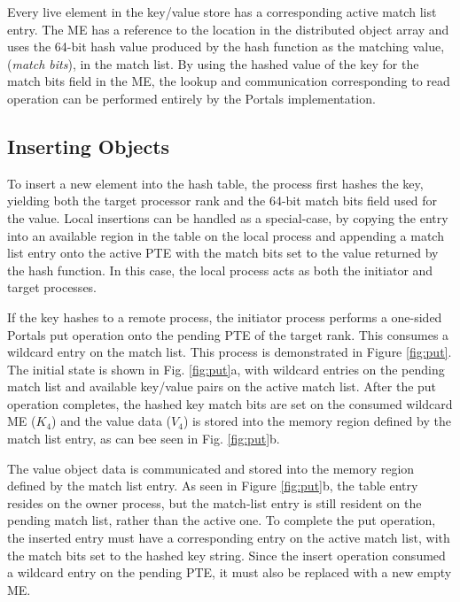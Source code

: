 Every live element in the key/value store has a corresponding active match list
entry. The ME has a reference to the location in the distributed object array
and uses the 64-bit hash value produced by the hash function as the matching
value, ({\em match bits}), in the match list. By using the hashed value of the
key for the match bits field in the ME, the lookup and communication
corresponding to read operation can be performed entirely by the Portals
implementation.



%

 

\subsection{Inserting Objects}

To insert a new element into the hash table, the process first hashes the key,
yielding both the target processor rank and the 64-bit match bits field used for
the value. Local insertions can be handled as a special-case, by copying the entry
into an available region in the table on the local process and appending a
match list entry onto the active PTE with the match bits set to the value
returned by the hash function. In this case, the local process acts as both 
the initiator and target processes.

If the key hashes to a remote process, the initiator process performs a
one-sided Portals put operation onto the pending PTE of the target rank. This
consumes a wildcard entry on the match list. This process is demonstrated in
Figure \ref{fig:put}. The initial state is shown in Fig. \ref{fig:put}a, with
wildcard entries on the pending match list and available key/value pairs on the
active match list. After the put operation completes, the hashed key match bits
are set on the consumed wildcard ME ($K_4$) and the value data ($V_4$) is
stored into the memory region defined by the match list entry, as can bee seen
in Fig. \ref{fig:put}b.

The value object data is communicated and stored into the memory region defined
by the match list entry. As seen in Figure \ref{fig:put}b, the table entry
resides on the owner process, but the match-list entry is still resident on the
pending match list, rather than the active one. To complete the put operation,
the inserted entry must have a corresponding entry on the active match list,
with the match bits set to the hashed key string. Since the insert operation
consumed a wildcard entry on the pending PTE, it must also be replaced with a
new empty ME.

